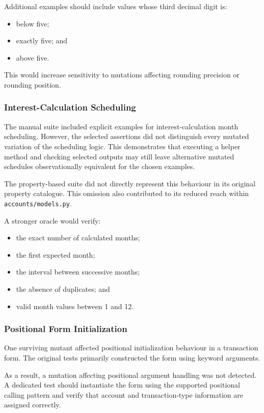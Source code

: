 \documentclass[12pt]{article}
\begin{document}
Additional examples should include values whose third decimal digit is:

\begin{itemize}
    \item below five;
    \item exactly five; and
    \item above five.
\end{itemize}

This would increase sensitivity to mutations affecting rounding precision or
rounding position.

\subsubsection{Interest-Calculation Scheduling}

The manual suite included explicit examples for interest-calculation month
scheduling. However, the selected assertions did not distinguish every mutated
variation of the scheduling logic. This demonstrates that executing a helper
method and checking selected outputs may still leave alternative mutated
schedules observationally equivalent for the chosen examples.

The property-based suite did not directly represent this behaviour in its
original property catalogue. This omission also contributed to its reduced
reach within \texttt{accounts/models.py}.

A stronger oracle would verify:

\begin{itemize}
    \item the exact number of calculated months;
    \item the first expected month;
    \item the interval between successive months;
    \item the absence of duplicates; and
    \item valid month values between 1 and 12.
\end{itemize}

\subsubsection{Positional Form Initialization}

One surviving mutant affected positional initialization behaviour in a
transaction form. The original tests primarily constructed the form using
keyword arguments.

As a result, a mutation affecting positional argument handling was not
detected. A dedicated test should instantiate the form using the supported
positional calling pattern and verify that account and transaction-type
information are assigned correctly.
\end{document}
